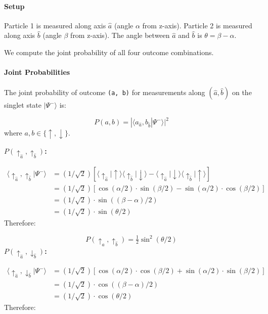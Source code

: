 \documentclass[aps,prd,preprint,superscriptaddress,longbibliography,floatfix]{revtex4-2}
\theoremstyle{remark}
\begin{document}
\paragraph{Setup}

Particle 1 is measured along axis $\hat{a}$ (angle $\alpha$ from z-axis). Particle 2 is measured along axis \texttt{$\hat{b}$} (angle $\beta$ from z-axis). The angle between $\hat{a}$ and \texttt{$\hat{b}$} is $\theta = \beta - \alpha$.

We compute the joint probability of all four outcome combinations.


\paragraph{Joint Probabilities}

The joint probability of outcome \texttt{(a, b)} for measurements along $(\hat{a}, \hat{b})$ on the singlet state $|\Psi^{-}\rangle$ is:


\begin{equation}
    P(a, b) = |\langle a_{\hat{a}}, b_{\hat{b}}|\Psi^{-}\rangle|^{2}
\end{equation}
where $a, b \in \{\uparrow, \downarrow\}$.

\textbf{$P(\uparrow_{\hat{a}}, \uparrow_{\hat{b}})$:}


\begin{align}
    \langle\uparrow_{\hat{a}}, \uparrow_{\hat{b}}|\Psi^{-}\rangle &= (1/\sqrt{2})[\langle\uparrow_{\hat{a}}|\uparrow\rangle\langle\uparrow_{\hat{b}}|\downarrow\rangle - \langle\uparrow_{\hat{a}}|\downarrow\rangle\langle\uparrow_{\hat{b}}|\uparrow\rangle] \\
    & = (1/\sqrt{2})[\cos(\alpha/2) \cdot \sin(\beta/2) - \sin(\alpha/2) \cdot \cos(\beta/2)] \\
    & = (1/\sqrt{2}) \cdot \sin((\beta - \alpha)/2) \\
    & = (1/\sqrt{2}) \cdot \sin(\theta/2)
\end{align}
Therefore:


\begin{equation}
    P(\uparrow_{\hat{a}}, \uparrow_{\hat{b}}) = \tfrac{1}{2} \sin^2(\theta/2)
\end{equation}
\textbf{$P(\uparrow_{\hat{a}}, \downarrow_{\hat{b}})$:}


\begin{align}
    \langle\uparrow_{\hat{a}}, \downarrow_{\hat{b}}|\Psi^{-}\rangle &= (1/\sqrt{2})[\cos(\alpha/2) \cdot \cos(\beta/2) + \sin(\alpha/2) \cdot \sin(\beta/2)] \\
    & = (1/\sqrt{2}) \cdot \cos((\beta - \alpha)/2) \\
    & = (1/\sqrt{2}) \cdot \cos(\theta/2)
\end{align}
Therefore:
\end{document}
